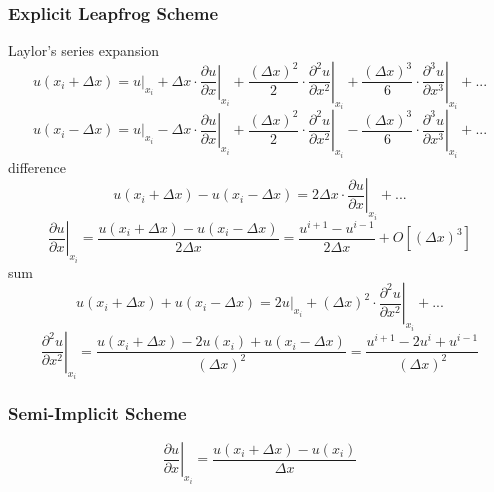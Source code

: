 \subsubsection{Explicit Leapfrog Scheme}
Laylor's series expansion 
\begin{equation}
  u(x_i+\Delta x) = u|_{x_i} + 
  \Delta x\cdot\left.\frac{\partial u}{\partial x}\right|_{x_i} + 
  \frac{(\Delta x)^2}{2}\cdot\left.\frac{\partial ^2 u}{\partial x^2}\right|_{x_i} + 
  \frac{(\Delta x)^3}{6}\cdot\left.\frac{\partial ^3 u}{\partial x^3}\right|_{x_i} + ...
\end{equation}
\begin{equation}
  u(x_i-\Delta x) = u|_{x_i} -
  \Delta x\cdot\left.\frac{\partial u}{\partial x}\right|_{x_i} + 
  \frac{(\Delta x)^2}{2}\cdot\left.\frac{\partial ^2 u}{\partial x^2}\right|_{x_i} -
  \frac{(\Delta x)^3}{6}\cdot\left.\frac{\partial ^3 u}{\partial x^3}\right|_{x_i} + ...
\end{equation}
difference 
\begin{equation}
  u(x_i+\Delta x) - u(x_i-\Delta x) = 2\Delta x\cdot\left.\frac{\partial u}{\partial x}\right|_{x_i}+...
\end{equation}
\begin{equation}
  \left.\frac{\partial u}{\partial x}\right|_{x_i} = \frac{u(x_i+\Delta x) - u(x_i-\Delta x)}{2\Delta x} = \frac{u^{i+1} - u^{i-1}}{2\Delta x} + O[(\Delta x)^3]
\end{equation}
sum 
\begin{equation}
  u(x_i+\Delta x) + u(x_i-\Delta x) = \left.2u\right|_{x_i} + (\Delta x)^2\cdot\left.\frac{\partial ^2 u}{\partial x^2}\right|_{x_i} + ...
\end{equation}
\begin{equation}
  \left.\frac{\partial^2 u}{\partial x^2}\right|_{x_i} = \frac{u(x_i+\Delta x) - 2u(x_i) + u(x_i-\Delta x)}{(\Delta x)^2} = \frac{u^{i+1} - 2u^i + u^{i-1}}{(\Delta x)^2} %
\end{equation}
\subsubsection{Semi-Implicit Scheme}
\begin{equation}
  \left.\frac{\partial u}{\partial x}\right|_{x_i} = \frac{u(x_i+\Delta x) - u(x_i)}{\Delta x}
\end{equation}
